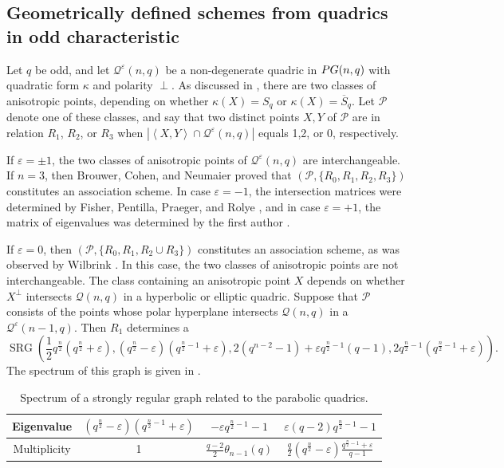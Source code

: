 \documentclass[a4paper]{article}
\theoremstyle{definition}
\newcommand{\eps}{\varepsilon}
\newcommand{\vspan}[1]{\left \langle #1 \right \rangle}
\newcommand{\pg}{\textnormal{PG}}
\newcommand{\pp}{\mathcal P}
\newcommand{\mq}{\mathcal Q}
\DeclareMathOperator{\SRG}{SRG}
\newcommand{\ns}{\overline S}
\begin{document}
\subsection{Geometrically defined schemes from quadrics in odd characteristic}
 \label{SubSecGeomSchemesOdd}

Let $q$ be odd, and let $\mq^\eps(n,q)$ be a non-degenerate quadric in $\pg(n,q)$ with quadratic form $\kappa$ and polarity $\perp$.
As discussed in , there are two classes of anisotropic points, depending on whether $\kappa(X) = S_q$ or $\kappa(X) = \ns_q$.
Let $\pp$ denote one of these classes, and say that two distinct points $X,Y$ of $\pp$ are in relation $R_1$, $R_2$, or $R_3$ when $| \vspan{X,Y} \cap \mq^\eps(n,q) |$ equals 1,2, or 0, respectively.


If $\eps = \pm 1$, the two classes of anisotropic points of $\mq^\eps(n,q)$ are interchangeable.
If $n=3$, then Brouwer, Cohen, and Neumaier \cite[Theorem 12.2.1]{bcn} proved that $(\pp,\{R_0,R_1,R_2,R_3\})$ constitutes an association scheme.
In case $\eps=-1$, the intersection matrices were determined by Fisher, Pentilla, Praeger, and Rolye \cite[p.\ 335]{FisherPenttilaPraegerRoyle}, and in case $\eps=+1$, the matrix of eigenvalues was determined by the first author \cite[\S 3]{adriaensen2022stability}.


If $\eps=0$, then $(\pp,\{R_0,R_1,R_2 \cup R_3\})$ constitutes an association scheme, as was observed by Wilbrink \cite[\S 7.D]{brouwervanlint}.
In this case, the two classes of anisotropic points are not interchangeable.
The class containing an anisotropic point $X$ depends on whether $X^\perp$ intersects $\mq(n,q)$ in a hyperbolic or elliptic quadric.
Suppose that $\pp$ consists of the points whose polar hyperplane intersects $\mq(n,q)$ in a $\mq^\eps(n-1,q)$.
Then $R_1$ determines a 
\[
 \SRG \left( \frac 12 q^\frac n2 \left( q^\frac n2 + \eps \right), \left( q^\frac n2 - \eps \right) \left( q^{\frac n2 - 1} + \eps \right), 2(q^{n-2} - 1) + \eps q^{\frac n2 - 1}(q-1), 2 q^{\frac n2 - 1} \left( q^{\frac n2 - 1} + \eps \right) \right).
\]
The spectrum of this graph is given in . 
\begin{table}[h!]
 \centering
 \begin{tabular}{c || c | c | c}
  Eigenvalue & $\left( q^\frac n2 - \eps \right) \left( q^{\frac n2 - 1} + \eps \right)$ & $-\eps q^{\frac n2 -1} - 1$ & $\eps (q-2)q^{\frac n2 - 1} - 1$ \\ \hline
  Multiplicity & 1 & $\frac {q-2}2 \theta_{n-1}(q)$ & $\frac q 2  \left( q^\frac n2 -\eps \right) \frac{q^{\frac n2 - 1}+\eps}{q-1}$
 \end{tabular}
 \caption{Spectrum of a strongly regular graph related to the parabolic quadrics.}
 \label{Tab:SpecSRGParabolic}
\end{table}
\end{document}
